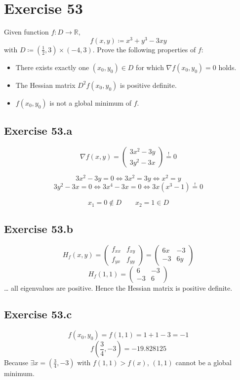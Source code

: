 \documentclass[a4paper]{article}
\theoremstyle{definition}
\begin{document}
\section{Exercise 53}
\begin{ex}
  Given function $f: D \to \mathbb R$,
  \[ f(x,y) \coloneqq x^3 + y^3 - 3xy \]
  with $D \coloneqq (\frac12, 3) \times (-4,3)$. Prove the following properties of $f$:
  \begin{itemize}
  \item There exists exactly one $(x_0, y_0) \in D$ for which $\nabla f(x_0,y_0) = 0$ holds.
  \item The Hessian matrix $D^2 f(x_0,y_0)$ is positive definite.
  \item $f(x_0, y_0)$ is not a global minimum of $f$.
  \end{itemize}
\end{ex}

\subsection{Exercise 53.a}
\[ \nabla f(x,y) = \begin{pmatrix} 3x^2 - 3y \\ 3y^2 - 3x \end{pmatrix} \stackrel{!}{=} 0 \]

\[ 3x^2 - 3y = 0 \iff 3x^2 = 3y \iff x^2 = y \]
\[ 3y^2 - 3x = 0 \iff 3x^4 - 3x = 0 \iff 3x (x^3 - 1) \overset{!}{=} 0 \]

\[ x_1 = 0 \not\in D \qquad x_2 = 1 \in D \]

\subsection{Exercise 53.b}
\[ H_f(x,y) = \begin{pmatrix} f_{xx} & f_{xy} \\ f_{yx} & f_{yy} \end{pmatrix} = \begin{pmatrix} 6x & -3 \\ -3 & 6y \end{pmatrix} \]
\[ H_f(1,1) = \begin{pmatrix} 6 & -3 \\ -3 & 6 \end{pmatrix} \]
\dots
all eigenvalues are positive. Hence the Hessian matrix is positive definite.

\subsection{Exercise 53.c}
\[ f(x_0, y_0) = f(1, 1) = 1 + 1 - 3 = -1 \]
\[ f(\frac34, -3) = -19.828125 \]
Because $\exists x = (\frac34, -3)$ with $f(1, 1) > f(x)$, $(1,1)$ cannot be a global minimum.
\end{document}
